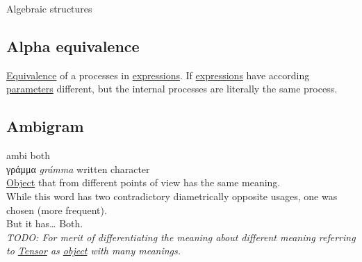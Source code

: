 \documentclass[11pt]{article}
\begin{document}
\label{orgbade927}Algebraic structures\\

\subsection{\label{orgea0be9b}Alpha equivalence}
\label{sec:org71b15cd}
\hyperref[orgad1fc87]{Equivalence} of a processes in \hyperref[org9eb2c72]{expressions}. If \hyperref[org9eb2c72]{expressions} have according \hyperref[orgbeb3b81]{parameters} different, but the internal processes are literally the same process.\\

\subsection{\label{org3820370}Ambigram}
\label{sec:orgd4f3857}
ambi both\\
γράμμα \emph{grámma} written character\\

\hyperref[org025aac8]{Object} that from different points of view has the same meaning.\\

While this word has two contradictory diametrically opposite usages, one was chosen (more frequent).\\

But it has\ldots{} Both.\\

\emph{TODO: For merit of differentiating the meaning about different meaning referring to \hyperref[orgae4c474]{Tensor} as \hyperref[org025aac8]{object} with many meanings.}\\
\end{document}
